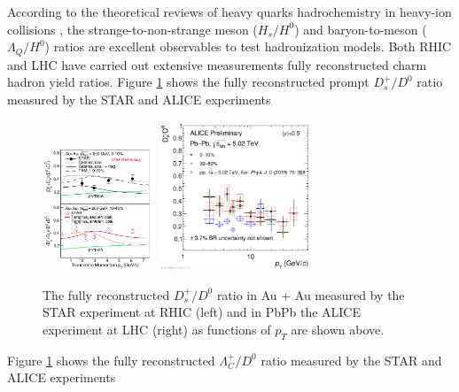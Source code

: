 According to the theoretical reviews of heavy quarks hadrochemistry in heavy-ion collisions \cite{StrangetoLight,BaryontoMeson}, the strange-to-non-strange meson ($H_s/H^0$) and baryon-to-meson ($\Lambda_{Q}/H^{0}$) ratios are excellent observables to test hadronization models. Both RHIC and LHC have carried out extensive measurements fully reconstructed charm hadron yield ratios. Figure \ref{HadroPlotCharm} shows the fully reconstructed prompt $D^+_s/D^0$ ratio measured by the STAR \cite{} and ALICE \cite{} experiments


\begin{figure}[hbtp]
\begin{center}
\includegraphics[width=0.30\textwidth]{Figures/Chapter2/STARDsD0.png}
\includegraphics[width=0.41\textwidth]{Figures/Chapter2/ALICEDsD0.pdf}
\caption{The fully reconstructed $D_s^+/D^0$ ratio in Au + Au measured by the STAR experiment at RHIC (left) and in PbPb the ALICE experiment at LHC (right) as functions of $p_T$ are shown above.}
\label{HadroPlotCharm}
\end{center}
\end{figure}   



Figure \ref{HadroPlotCharm} shows the fully reconstructed $\Lambda_C^+/D^0$ ratio measured by the STAR and ALICE experiments



